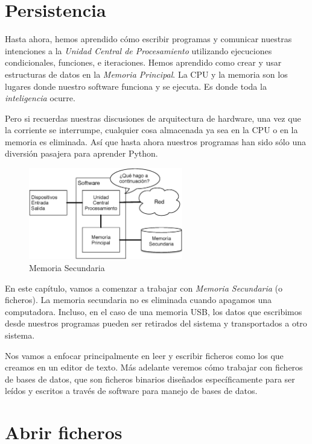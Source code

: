 \hypertarget{persistencia}{%
\section{Persistencia}\label{persistencia}}

 

Hasta ahora, hemos aprendido cómo escribir programas y comunicar
nuestras intenciones a la \emph{Unidad Central de Procesamiento}
utilizando ejecuciones condicionales, funciones, e iteraciones. Hemos
aprendido como crear y usar estructuras de datos en la \emph{Memoria
Principal}. La CPU y la memoria son los lugares donde nuestro software
funciona y se ejecuta. Es donde toda la \emph{inteligencia} ocurre.

Pero si recuerdas nuestras discusiones de arquitectura de hardware, una
vez que la corriente se interrumpe, cualquier cosa almacenada ya sea en
la CPU o en la memoria es eliminada. Así que hasta ahora nuestros
programas han sido sólo una diversión pasajera para aprender Python.

\begin{figure}
\centering
\includegraphics[width=0.6\textwidth]{images/arch.eps}
\caption{Memoria Secundaria}
\end{figure}

En este capítulo, vamos a comenzar a trabajar con \emph{Memoria
Secundaria} (o ficheros). La memoria secundaria no es eliminada cuando
apagamos una computadora. Incluso, en el caso de una memoria USB, los
datos que escribimos desde nuestros programas pueden ser retirados del
sistema y transportados a otro sistema.

Nos vamos a enfocar principalmente en leer y escribir ficheros como los
que creamos en un editor de texto. Más adelante veremos cómo trabajar
con ficheros de bases de datos, que son ficheros binarios diseñados
específicamente para ser leídos y escritos a través de software para
manejo de bases de datos.

\hypertarget{abrir-ficheros}{%
\section{Abrir ficheros}\label{abrir-ficheros}}


